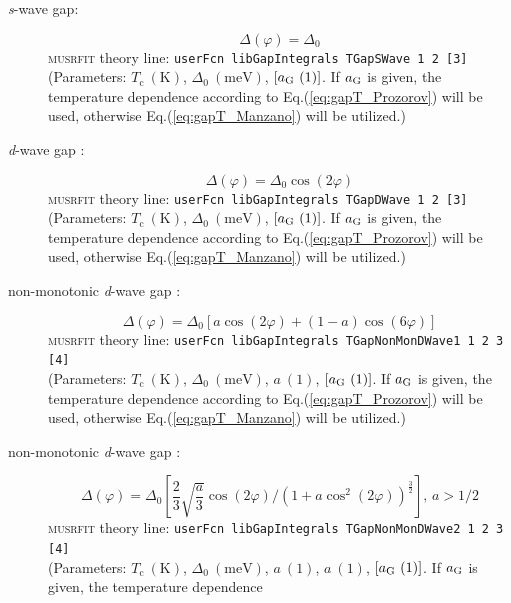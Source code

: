 \documentclass[twoside]{article}
\newcommand{\musrfit}{\textsc{musrfit}\xspace}
\begin{document}
\begin{description}
 \item[\textit{s}-wave gap:]
   \begin{equation}
     \Delta(\varphi) = \Delta_0
   \end{equation}
   \musrfit theory line: \verb?userFcn libGapIntegrals TGapSWave 1 2 [3]?\\
   (Parameters: $T_{\mathrm c}~(\mathrm{K})$, $\Delta_0~(\mathrm{meV})$, $[a_{\rm G}~(1)]$. If $a_{\rm G}$ is given, the temperature dependence 
    according to Eq.(\ref{eq:gapT_Prozorov}) will be used, otherwise Eq.(\ref{eq:gapT_Manzano}) will be utilized.)
 \item[\textit{d}-wave gap \cite{Deutscher}:] 
   \begin{equation}
     \Delta(\varphi) = \Delta_0\cos\left(2\varphi\right)
   \end{equation}
   \musrfit theory line: \verb?userFcn libGapIntegrals TGapDWave 1 2 [3]?\\
   (Parameters: $T_{\mathrm c}~(\mathrm{K})$, $\Delta_0~(\mathrm{meV})$, $[a_{\rm G}~(1)]$. If $a_{\rm G}$ is given, the temperature dependence 
    according to Eq.(\ref{eq:gapT_Prozorov}) will be used, otherwise Eq.(\ref{eq:gapT_Manzano}) will be utilized.)
 \item[non-monotonic \textit{d}-wave gap \cite{Matsui}:] 
   \begin{equation}
     \Delta(\varphi) = \Delta_0\left[a \cos\left(2\varphi\right) + (1-a)\cos\left(6\varphi\right)\right]
   \end{equation}
    \musrfit theory line: \verb?userFcn libGapIntegrals TGapNonMonDWave1 1 2 3 [4]?\\
    (Parameters: $T_{\mathrm c}~(\mathrm{K})$, $\Delta_0~(\mathrm{meV})$, $a~(1)$, $[a_{\rm G}~(1)]$. If $a_{\rm G}$ is given, the temperature dependence 
    according to Eq.(\ref{eq:gapT_Prozorov}) will be used, otherwise Eq.(\ref{eq:gapT_Manzano}) will be utilized.)
 \item[non-monotonic \textit{d}-wave gap \cite{Eremin}:]
    \begin{equation}
      \Delta(\varphi) = \Delta_0\left[\frac{2}{3} \sqrt{\frac{a}{3}}\cos\left(2\varphi\right) / \left( 1 + a\cos^2\left(2\varphi\right)\right)^{\frac{3}{2}}\right],\,a>1/2
    \end{equation}
    \musrfit theory line: \verb?userFcn libGapIntegrals TGapNonMonDWave2 1 2 3 [4]?\\
    (Parameters: $T_{\mathrm c}~(\mathrm{K})$, $\Delta_0~(\mathrm{meV})$, $a~(1)$, $a~(1)$, $[a_{\rm G}~(1)]$. If $a_{\rm G}$ is given, the temperature dependence 

\end{description}
\end{document}
